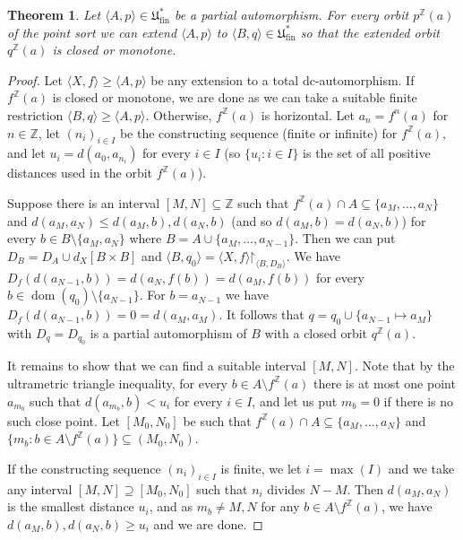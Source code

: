 \documentclass[oneside,notitlepage,12pt]{article}
\newtheorem{tw}{Theorem}[section]
\theoremstyle{definition}
\theoremstyle{remark}
\newcommand \set [1]{\{#1\}}
\newcommand \seq [1]{\langle #1 \rangle}
\newcommand \im [1]{[#1]} %
\newcommand \restr [1] {\mathord{\upharpoonright}_{#1}}
\newcommand \dom {\operatorname{dom}}
\newcommand \subs {\subseteq}
\newcommand \Z {\mathbb{Z}}
\newcommand \fin {{\operatorname{fin}}}
\newcommand \Ult {\mathfrak{U}}
\begin{document}
\color{black}
\begin{tw}\label{closedormonotone}
    Let $\seq{A, p} \in \Ult^*_\fin$ be a partial automorphism.
    For every orbit $p^\Z(a)$ of the point sort we can extend $\seq{A, p}$ to $\seq{B, q} \in \Ult^*_\fin$ so that the extended orbit $q^\Z(a)$ is closed or monotone.
\end{tw}
\begin{proof}
    Let $\seq{X, f} \geq \seq{A, p}$ be any extension to a total dc-automorphism.
    If $f^\Z(a)$ is closed or monotone, we are done as we can take a suitable finite restriction $\seq{B, q} \geq \seq{A, p}$.
    Otherwise, $f^\Z(a)$ is horizontal.
    Let $a_n = f^n(a)$ for $n \in \Z$, let $(n_i)_{i \in I}$ be the constructing sequence (finite or infinite) for $f^\Z(a)$, and let $u_i = d(a_0, a_{n_i})$ for every $i \in I$ (so $\set{u_i: i \in I}$ is the set of all positive distances used in the orbit $f^\Z(a)$).

    Suppose there is an interval $[M, N] \subs \Z$ such that $f^\Z(a) \cap A \subs \set{a_M, \ldots, a_N}$ and $d(a_M, a_N) \leq d(a_M, b), d(a_N, b)$ (and so $d(a_M, b) = d(a_N, b)$) for every $b \in B \setminus \set{a_M, a_N}$ where $B = A \cup \set{a_M, \ldots, a_{N - 1}}$.
    Then we can put $D_B = D_A \cup d_X\im{B \times B}$ and $\seq{B, q_0} = \seq{X, f}\restr{\seq{B, D_B}}$.
    We have $D_f(d(a_{N - 1}, b)) = d(a_N, f(b)) = d(a_M, f(b))$ for every $b \in \dom(q_0) \setminus \set{a_{N - 1}}$.
    For $b = a_{N - 1}$ we have $D_f(d(a_{N - 1}, b)) = 0 = d(a_M, a_M)$.
    It follows that $q = q_0 \cup \set{a_{N - 1} \mapsto a_M}$ with $D_q = D_{q_0}$ is a partial automorphism of $B$ with a closed orbit $q^\Z(a)$.

    It remains to show that we can find a suitable interval $[M, N]$.
    Note that by the ultrametric triangle inequality, for every $b \in A \setminus f^\Z(a)$ there is at most one point $a_{m_b}$ such that $d(a_{m_b}, b) < u_i$ for every $i \in I$, and let us put $m_b = 0$ if there is no such close point.
    Let $[M_0, N_0]$ be such that $f^\Z(a) \cap A \subs \set{a_M, \ldots, a_N}$ and $\set{m_b: b \in A \setminus f^\Z(a)} \subs (M_0, N_0)$.
    
    If the constructing sequence $(n_i)_{i \in I}$ is finite, we let $i = \max(I)$ and we take any interval $[M, N] \supseteq [M_0, N_0]$ such that $n_i$ divides $N - M$.
    Then $d(a_M, a_N)$ is the smallest distance $u_i$, and as $m_b \neq M, N$ for any $b \in A \setminus f^\Z(a)$, we have $d(a_M, b), d(a_N, b) \geq u_i$ and we are done.


\end{proof}
\end{document}
